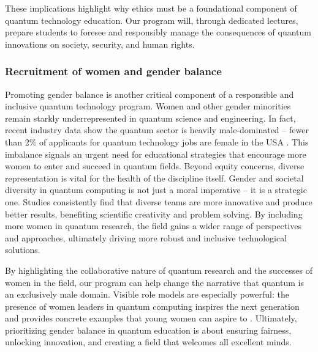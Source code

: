 \documentclass{scrreprt}
\begin{document}
These implications highlight why ethics must be a foundational
component of quantum technology education. Our %
program will, through dedicated lectures, 
prepare students to foresee and responsibly manage the consequences of
quantum innovations on society, security, and human rights.


\subsubsection{Recruitment of women and gender balance}

Promoting gender balance is another critical component of a
responsible and inclusive quantum technology program. Women and other
gender minorities remain starkly underrepresented in quantum science
and engineering. In fact, recent industry data show the quantum sector
is heavily male-dominated – fewer than $2\%$ of applicants for quantum
technology jobs are female in the USA \cite{workforce}. This imbalance signals an urgent need for
educational strategies that encourage more women to enter and succeed
in quantum fields. Beyond equity concerns, diverse representation is
vital for the health of the discipline itself. Gender and societal diversity in
quantum computing is not just a moral imperative – it is  a strategic one. 
Studies consistently find that diverse teams are more innovative and
produce better results, benefiting scientific creativity and
problem solving. By including more women in quantum research, the field
gains a wider range of perspectives and approaches, ultimately driving
more robust and inclusive technological solutions.


By highlighting the collaborative nature of quantum research and the
successes of women in the field, our program can help change the
narrative that quantum is an exclusively male domain. Visible role
models are especially powerful: the presence of women leaders in
quantum computing inspires the next generation and provides concrete
examples that young women can aspire to . Ultimately, prioritizing
gender balance in quantum education is about ensuring fairness,
unlocking innovation, and creating a field that welcomes all excellent
minds.
\end{document}
